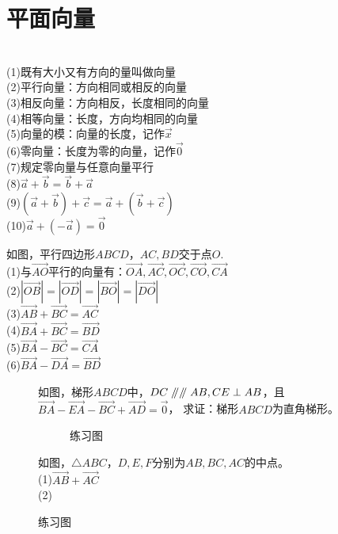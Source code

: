 \section{平面向量}
\begin{theorem}
    $\quad$ \\
    (1)既有大小又有方向的量叫做向量 \\
    (2)平行向量：方向相同或相反的向量 \\
    (3)相反向量：方向相反，长度相同的向量 \\
    (4)相等向量：长度，方向均相同的向量 \\
    (5)向量的模：向量的长度，记作$\vec{x}$ \\
    (6)零向量：长度为零的向量，记作$\vec{0}$ \\
    (7)规定零向量与任意向量平行 \\
    (8)$\vec{a}+\vec{b}=\vec{b}+\vec{a}$ \\
    (9)$(\vec{a}+\vec{b})+\vec{c}=\vec{a}+(\vec{b}+\vec{c})$ \\
    (10)$\vec{a}+(-\vec{a})=\vec{0}$
\end{theorem}
\begin{definition}
    如图，平行四边形$ABCD$，$AC,BD$交于点$O$. \\
    (1)与$\overrightarrow{AO}$平行的向量有：$\overrightarrow{OA},\overrightarrow{AC},\overrightarrow{OC},\overrightarrow{CO},\overrightarrow{CA}$ \\
    (2)$|\overrightarrow{OB}|=|\overrightarrow{OD}|=|\overrightarrow{BO}|=|\overrightarrow{DO}|$ \\
    (3)$\overrightarrow{AB}+\overrightarrow{BC}=\overrightarrow{AC}$ \\
    (4)$\overrightarrow{BA}+\overrightarrow{BC}=\overrightarrow{BD}$ \\
    (5)$\overrightarrow{BA}-\overrightarrow{BC}=\overrightarrow{CA}$ \\
    (6)$\overrightarrow{BA}-\overrightarrow{DA}=\overrightarrow{BD}$ \\
\end{definition}
\begin{figure}[H]
    \centering
    \resizebox{3cm}{!}{}
    \caption{平行四边形与向量}
    \begin{problem}
    如图，梯形$ABCD$中，$DC\mathrel{/\mkern-5mu/} \mathrel{/\mkern-5mu/} AB,CE\perp AB$，且$\overrightarrow{BA}-\overrightarrow{EA}-\overrightarrow{BC}+\overrightarrow{AD}=\vec{0}$，
    求证：梯形$ABCD$为直角梯形。
    \end{problem}
    \begin{figure}[H]
        \centering
        \resizebox{4cm}{!}{}
        \caption{练习图}
    \end{figure}
    \begin{problem}
    如图，$\triangle ABC$，$D,E,F$分别为$AB,BC,AC$的中点。\\
    (1)$\overrightarrow{AB}+\overrightarrow{AC}$ \\
    (2)
    \end{problem}
\end{figure}
